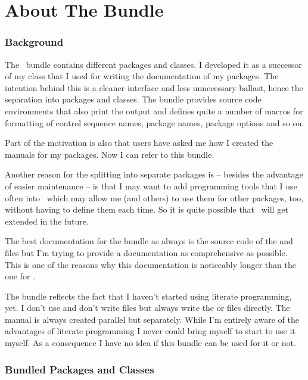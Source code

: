 \documentclass[load-preamble]{cnltx-doc}
\newcommand*\file[1]{\code{#1}}
\begin{document}
\part{About The Bundle}

\section{Background}

The \cnltx\ bundle contains different packages and classes.  I developed
it as a successor of my class  that I used for writing the
documentation of my packages.   The intention behind this is a cleaner
interface and less unnecessary ballast, hence the separation into packages and
classes.  The bundle provides source code environments that also print the
output and defines quite a number of macros for formatting of control sequence
names, package names, package options and so on.

Part of the motivation is also that users have asked me how I created the
manuals for my packages.  Now I can refer to this bundle.

Another reason for the splitting into separate packages is -- besides the
advantage of easier maintenance -- is that I may want to add programming tools
that I use often into \cnltxbase\ which may allow me (and others) to use them
for other packages, too, without having to define them each time.  So it is
quite possible that \cnltxbase\ will get extended in the future.

The best documentation for the bundle as always is the source code of the
\file{sty} and \file{cls} files but I'm trying to provide a documentation as
comprehensive as possible.  This is one of the reasons why this documentation
is noticeably longer than the one for .

The bundle reflects the fact that I haven't started using literate
programming, yet.  I don't use  and don't write \file{dtx}
files but always write the \file{sty} or  files directly.  The
manual is always created parallel but separately.  While I'm entirely aware of
the advantages of literate programming I never could bring myself to start
to use it myself.  As a consequence I have no idea if this bundle can be used
for it or not.

\section{Bundled Packages and Classes}
\end{document}
